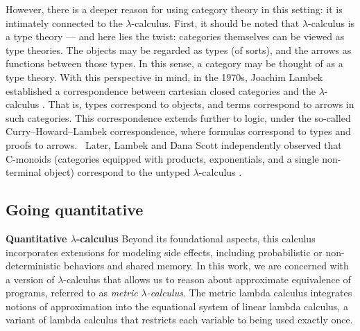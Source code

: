 However, there is a deeper reason for using category theory in this setting: it is intimately connected to the $\lambda$-calculus. First, it should be noted that $\lambda$-calculus is a type theory --- and here lies the twist: categories themselves can be viewed as type theories. The objects may be regarded as types (of sorts), and the arrows as functions between those types. In this sense, a category may be thought of as a type theory. With this perspective in mind, in the 1970s, Joachim Lambek established a correspondence between cartesian closed categories and the $\lambda$-calculus \cite{lambek1980lambda}. That is, types correspond to objects, and terms correspond to arrows in such categories. This correspondence extends further to logic, under the so-called Curry–Howard–Lambek correspondence, where formulas correspond to types and proofs to arrows.  Later, Lambek and Dana Scott independently observed that C-monoids (\ie categories equipped with products, exponentials, and a single non-terminal object) correspond to the untyped $\lambda$-calculus \cite{lambekscott988}.









\subsection*{Going quantitative}

\textbf{Quantitative $\lambda$-calculus}
Beyond its foundational aspects, this calculus incorporates extensions for modeling side effects, including probabilistic or non-deterministic behaviors and shared memory. In this work, we are concerned with a version of $\lambda$-calculus that allows us to reason about approximate equivalence of programs, referred to as \emph{metric }$\lambda$\emph{-calculus}. The metric lambda calculus integrates notions of
approximation into the equational system of linear lambda calculus, a variant of lambda calculus that restricts each variable to being used exactly once.

